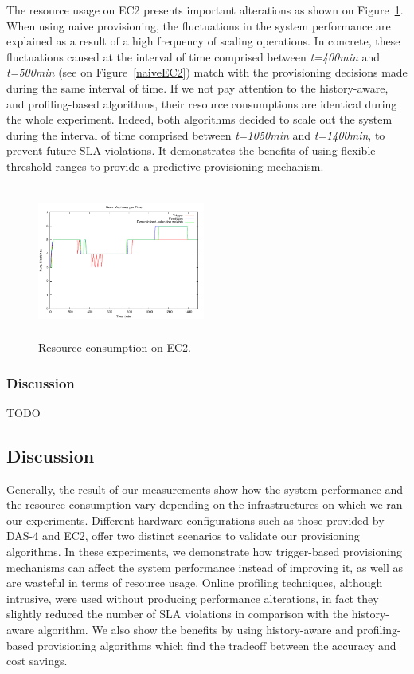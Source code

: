 The resource usage on EC2 presents important alterations as shown on Figure~\ref{resEC2}. When using naive provisioning, the fluctuations in the system performance are explained as a result of a high frequency of scaling operations. In concrete, these fluctuations caused at the interval of time comprised between \emph{t=400min} and \emph{t=500min} (see on Figure~\ref{naiveEC2}) match with the provisioning decisions made during the same interval of time. If we not pay attention to the history-aware, and profiling-based algorithms, their resource consumptions are identical during the whole experiment. Indeed, both algorithms decided to scale out the system during the interval of time comprised between \emph{t=1050min} and \emph{t=1400min}, to prevent future SLA violations. It demonstrates the benefits of using flexible threshold ranges to provide a predictive provisioning mechanism.


\begin{figure}
\begin{center}
\includegraphics[width=0.49\textwidth, height=5cm]{./images/heterogeneous/numMachinesCompEC2}
\end{center}
\caption{Resource consumption on EC2.}
\label{resEC2}
\end{figure}


\subsubsection{Discussion}

TODO

\subsection{Discussion}



Generally, the result of our measurements show how the system performance and the resource consumption vary depending on the infrastructures on which we ran our experiments. Different hardware configurations such as those provided by DAS-4 and EC2, offer two distinct scenarios to validate our provisioning algorithms.  In these experiments, we demonstrate how trigger-based provisioning mechanisms can affect the system performance instead of improving it, as well as are wasteful in terms of resource usage. Online profiling techniques, although intrusive, were used without producing performance alterations, in fact they slightly reduced the number of SLA violations in comparison with the history-aware algorithm. We also show the benefits by using history-aware and profiling-based provisioning algorithms which find the tradeoff between the accuracy and cost savings. 

